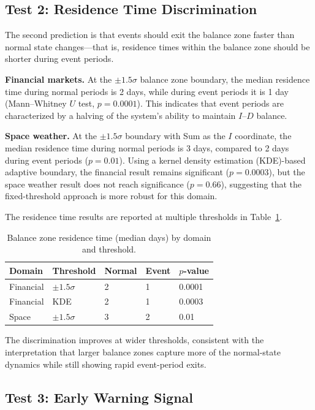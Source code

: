 \documentclass[aip,cha,reprint,amsmath,amssymb]{revtex4-2}
\begin{document}
\subsection{Test 2: Residence Time Discrimination}

The second prediction is that events should exit the balance zone faster than normal state changes---that is, residence times within the balance zone should be shorter during event periods.

\textbf{Financial markets.} At the $\pm 1.5\sigma$ balance zone boundary, the median residence time during normal periods is 2 days, while during event periods it is 1 day (Mann--Whitney $U$ test, $p = 0.0001$). This indicates that event periods are characterized by a halving of the system's ability to maintain $I$--$D$ balance.

\textbf{Space weather.} At the $\pm 1.5\sigma$ boundary with Sum as the $I$ coordinate, the median residence time during normal periods is 3 days, compared to 2 days during event periods ($p = 0.01$). Using a kernel density estimation (KDE)-based adaptive boundary, the financial result remains significant ($p = 0.0003$), but the space weather result does not reach significance ($p = 0.66$), suggesting that the fixed-threshold approach is more robust for this domain.

The residence time results are reported at multiple thresholds in Table~\ref{tab:residence}.

\begin{table}[h]
\caption{\label{tab:residence}Balance zone residence time (median days) by domain and threshold.}
\centering
\begin{tabular}{lllll}
Domain & Threshold & Normal & Event & $p$-value \\
\hline
Financial & $\pm 1.5\sigma$ & 2 & 1 & 0.0001 \\
Financial & KDE & 2 & 1 & 0.0003 \\
Space & $\pm 1.5\sigma$ & 3 & 2 & 0.01 \\
\end{tabular}
\end{table}

The discrimination improves at wider thresholds, consistent with the interpretation that larger balance zones capture more of the normal-state dynamics while still showing rapid event-period exits.

\subsection{Test 3: Early Warning Signal}
\end{document}
